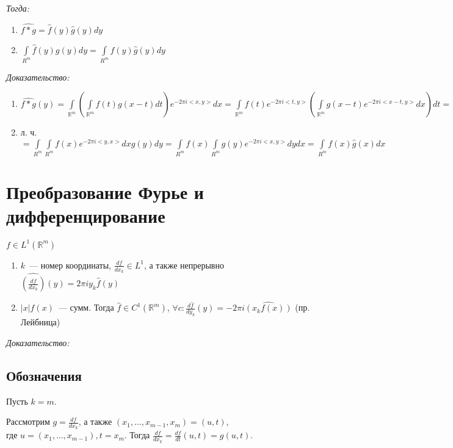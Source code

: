 \documentclass[paper=a4, fontsize=17pt]{article}
\begin{document}
	\emph{Тогда:}
	\begin{enumerate}
		\item $ \widehat{f \ast g} = \widehat{f}(y)\widehat{g}(y) dy$
		\item $ \int\limits_{R^m} \widehat{f}(y)g(y) dy = \int\limits_{R^m} f(y)\widehat{g}(y) dy $
	\end{enumerate}
	\emph{Доказательство:}
	\begin{enumerate}
		\item $ \widehat{f \ast g}(y)
		= \int\limits_{\mathbb{R}^m}(\int\limits_{\mathbb{R}^m} f(t) g(x - t) dt) e^{-2 \pi i <x, y>}dx = \int\limits_{\mathbb{R}^m} f(t) e^{-2 \pi i <t, y>}(\int\limits_{\mathbb{R}^m} g(x - t) e^{-2 \pi i <x - t, y>} dx) dt = \int\limits_{\mathbb{R}^m} f(t) e^{-2 \pi i <t, y>} \widehat{g}(y) dt = \widehat{f}(y) \cdot \widehat{g}(y)$

		\item л. ч.
		$ = \int\limits_{R^m} \int\limits_{R^m} f(x) e^{-2\pi i <y, x>} dx g(y) dy
		= \int\limits_{R^m} f(x) \int\limits_{R^m} g(y) e^{-2\pi i <x, y>} dy  dx = \int\limits_{R^m}f(x)\widehat{g}(x) dx$
	\end{enumerate}

\section{Преобразование Фурье и дифференцирование}

$f \in L^1(\mathds{R}^m)$
\begin{enumerate}
	\item $k$~--- номер координаты, $\frac{df}{dx_k} \in L^1$, а также непрерывно $ \widehat{(\frac{df}{dx_k})}(y) = 2\pi i y_k \hat{f}(y)$
	\item $|x|f(x)$~--- сумм. Тогда $\hat{f} \in C^1(\mathds{R}^m)$, $\forall c : \frac{d\hat{f}}{dy_k}(y) = -2\pi i \hat{(x_k f(x))}$ (пр. Лейбница)
\end{enumerate}

\emph{Доказательство:}

\subsection{Обозначения}

Пусть $k=m$.

Рассмотрим $g = \frac{df}{dx_k}$, а также $(x_1, \ldots, x_{m-1}, x_m) = (u, t)$,\\
где $u = (x_1, \ldots, x_{m-1}), t = x_m$. Тогда $\frac{df}{dx_k} = \frac{df}{dt}(u, t) = g(u, t)$.
\end{document}
